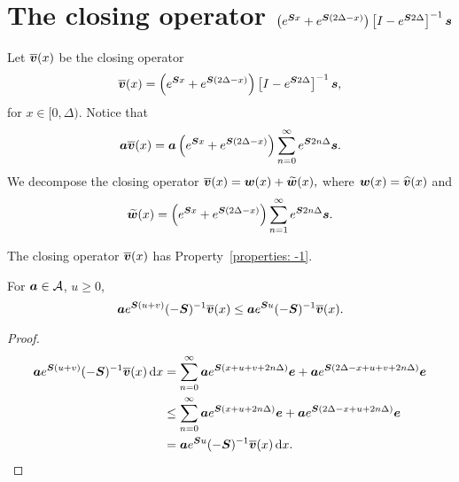 
\section{The closing operator \(\left(e^{\boldsymbol{S} x} + e^{\boldsymbol{S} (2\Delta-x)}\right)\left[I-e^{\boldsymbol S  2\Delta}\right]^{-1}\boldsymbol s \)}

Let \(\overline{\boldsymbol v} (x)\) be the closing operator 
\[\overline{\boldsymbol v}(x) = \left(e^{\boldsymbol{S}x} + e^{\boldsymbol{S}(2\Delta-x)}\right)\left[I-e^{\boldsymbol S 2\Delta}\right]^{-1}\boldsymbol s,\]
for \(x\in[0,\Delta)\).
Notice that 
\[\boldsymbol a \overline{\boldsymbol v}(x) = \boldsymbol a \left(e^{\boldsymbol{S}x} + e^{\boldsymbol{S}(2\Delta-x)}\right)\sum_{n=0}^\infty e^{\boldsymbol S2n\Delta}\boldsymbol s.\]
We decompose the closing operator \(\displaystyle \overline{\boldsymbol v}(x)=\boldsymbol w(x)+\widetilde{\boldsymbol w}(x),\) where \(\boldsymbol w(x) = \widehat{\boldsymbol v}(x)\) and 
\[\widetilde{\boldsymbol w}(x) = \left(e^{\boldsymbol{S}x} + e^{\boldsymbol{S}(2\Delta-x)}\right)\sum_{n=1}^\infty e^{\boldsymbol S2n\Delta}\boldsymbol s.\]

\begin{lem}
	The closing operator \(\overline{\boldsymbol v}(x)\) has Property~\ref{properties: -1}.
	
	For \(\boldsymbol a \in\mathcal A\), \(u\geq 0\), 
	\[\boldsymbol a e^{\boldsymbol S(u+v)}(-\boldsymbol S)^{-1}\overline{\boldsymbol v}(x) \leq \boldsymbol a e^{\boldsymbol Su}(-\boldsymbol S)^{-1}\overline{\boldsymbol v}(x) . \]
\end{lem}
\begin{proof}
	\begin{align*}
		 \boldsymbol a e^{\boldsymbol S(u+v)}(-\boldsymbol S)^{-1}\overline{\boldsymbol v}(x)\, \mathrm{d} x &= \sum_{n=0}^\infty\boldsymbol a e^{\boldsymbol S(x+u+v+2n\Delta)}\boldsymbol e + \boldsymbol a  e^{\boldsymbol S(2\Delta-x + u + v + 2n\Delta)} \boldsymbol e
		\\ &\leq \sum_{n=0}^\infty \boldsymbol a e^{\boldsymbol S(x+u+2n\Delta)}\boldsymbol e + \boldsymbol a  e^{\boldsymbol S(2\Delta-x + u + 2n\Delta)} \boldsymbol e
		\\ &= \boldsymbol a e^{\boldsymbol Su}(-\boldsymbol S)^{-1}\overline{\boldsymbol v}(x)\, \mathrm{d} x.
	\end{align*}
\end{proof}

